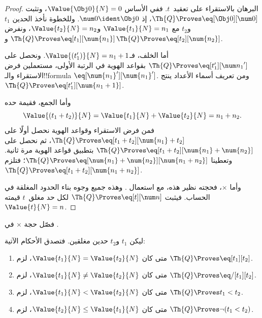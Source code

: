 \documentclass[../../../include/open-logic-section]{subfiles}
\begin{document}
\begin{proof}
البرهان بالاستقراء على تعقيد~$t$. ففي الأساس
$\Value{\Obj 0}{N}=0$، وتثبت $\Th{Q}\Proves\eq[\Obj 0][\num 0]$،
إذ $\num 0\ident\Obj 0$.
%
وللخطوة نأخذ الحدين $t_1$ و$t_2$ مع
$\Value{t_1}{N}=n_1$ و$\Value{t_2}{N}=n_2$،
ونفرض $\Th{Q}\Proves\eq[t_1][\num{n_1}]$
و$\Th{Q}\Proves\eq[t_2][\num{n_2}]$.

أما الخلف، فـ$\Value{(t_1')}{N}=n_1+1$.
ونحصل على $\Th{Q}\Proves\eq[t_1'][{\num n_1}']$
بقواعد الهوية في الرتبة الأولى، مستعملين فرض الاستقراء والـ!!{formula}
$\eq[\num{n_1}'][\num{n_1}']$.
ومن تعريف أسماء الأعداد ينتج
$\Th{Q}\Proves\eq[t_1'][\num{n_1+1}]$.

وأما الجمع، فقيمة حده
\[
      \Value{(t_1 + t_2)}{N}
    = \Value{t_1}{N} + \Value{t_2}{N}
    = n_1 + n_2.
\]
فمن فرض الاستقراء وقواعد الهوية نحصل أولًا على
$\Th{Q}\Proves\eq[t_1+t_2][\num{n_1}+t_2]$،
ثم نحصل على
$\Th{Q}\Proves\eq[t_1+t_2][\num{n_1}+\num{n_2}]$
بتطبيق قواعد الهوية مرة ثانية.
وتعطينا 
$\Th{Q}\Proves
\eq[\num{n_1}+\num{n_2}][\num{n_1+n_2}]$؛
فتلزم $\Th{Q}\Proves\eq[t_1+t_2][\num{n_1+n_2}]$.

وأما $\times$، فحجته نظير هذه، مع استعمال
.
%
وهذه جميع وجوه بناء الحدود المغلقة في الحساب. فيثبت
$\Th{Q}\Proves\eq[t][\num n]$ لكل حد مغلق~$t$ قيمته
$\Value{t}{N}=n$.
\end{proof}

\begin{prob}
فصّل حجة $\times$ في
.
\end{prob}

\begin{lem}
ليكن $t_1$ و$t_2$ حدين مغلقين. فتصدق الأحكام الآتية:
\begin{enumerate}
\item متى كان $\Value{t_1}{N}=\Value{t_2}{N}$،
    لزم $\Th{Q}\Proves\eq[t_1][t_2]$.
\item متى كان $\Value{t_1}{N}\neq\Value{t_2}{N}$،
    لزم $\Th{Q}\Proves\eq/[t_1][t_2]$.
\item متى كان $\Value{t_1}{N}<\Value{t_2}{N}$،
    لزم $\Th{Q}\Proves t_1<t_2$.
\item متى كان $\Value{t_2}{N}\leq\Value{t_1}{N}$،
    لزم $\Th{Q}\Proves\lnot(t_1<t_2)$.
\end{enumerate}
\end{lem}
\end{document}
